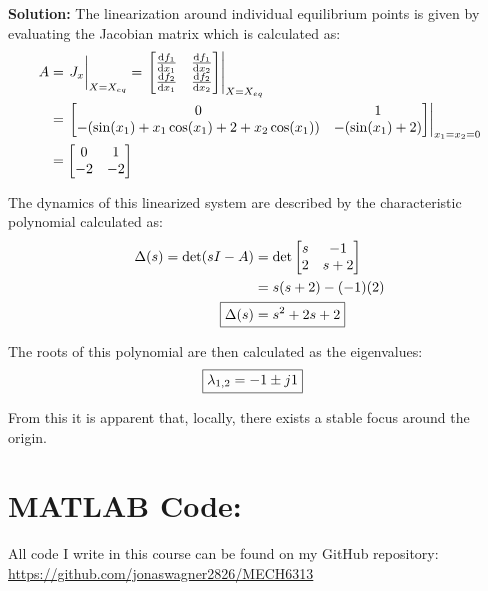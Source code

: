 \documentclass[letter]{article}
\numberwithin{equation}{section}
\begin{document}
\noindent
\textbf{Solution:}
The linearization around individual equilibrium points is given by evaluating the Jacobian matrix which is calculated as:
\begin{align}
	A &= \eval{J_x}_{X = X_{eq}}
	= \eval{\mqty[\dv{f_1}{x_1}&\dv{f_1}{x_2}\\\dv{f_2}{x_1}&\dv{f_2}{x_2}]}_{X=X_{eq}}\\
	&= \eval{\mqty[0 & 1\\
		-(\sin(x_1) + x_1 \cos(x_1) + 2 + x_2 \cos(x_1)) & -(\sin(x_1) + 2)
		]}_{x_1 = x_2 = 0}\\
	&= \mqty[0&1\\-2 &-2]
\end{align}

The dynamics of this linearized system are described by the characteristic polynomial calculated as:
\begin{align}
	\Delta(s) = \det(sI - A)
	&= \det\mqty[s &-1\\ 2 &s+2]\\
	&= s(s+2) - (-1) (2)\\
	\Aboxed{\Delta(s) &= s^2 + 2s + 2}
\end{align}

The roots of this polynomial are then calculated as the eigenvalues:
\begin{align}
	\Aboxed{\lambda_{1,2} &= -1 \pm j 1}
\end{align}

From this it is apparent that, locally, there exists a stable focus around the origin.















\newpage
\appendix
\section{MATLAB Code:}\label{apx:matlab}
All code I write in this course can be found on my GitHub repository:\\
\href{https://github.com/jonaswagner2826/MECH6313}{https://github.com/jonaswagner2826/MECH6313}

\end{document}
